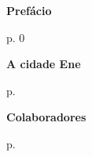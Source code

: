 \thispagestyle{empty}


\begin{vplace}
\begin{centering}
\textbf{Prefácio}

\medskip

p. 0\pageref{prefacio}

\medskip

\textbf{A cidade Ene}

\medskip

p. \pageref{cidade}

\medskip

\textbf{Colaboradores}

\medskip

p. \pageref{colaboradores}

\end{centering}
\end{vplace}

\pagebreak
\thispagestyle{empty}
